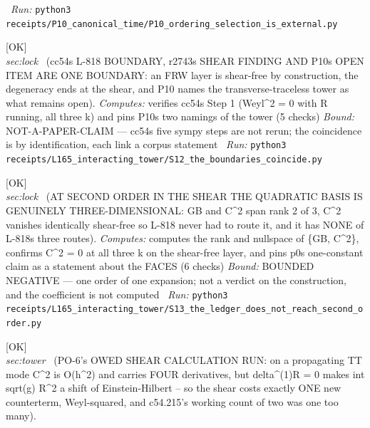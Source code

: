\begin{description}
\ \emph{Run:} \texttt{python3 receipts/P10\_canonical\_time/P10\_ordering\_selection\_is\_external.py}
\item[\label{rcpt:S12_the_boundaries_coincide}\textbf{}\quad\texttt{S12\_the\_boundaries\_coincide}]\hfill\textsf{[OK]}\\
\textit{sec:lock} \ (cc54s L-818 BOUNDARY, r2743s SHEAR FINDING AND P10s OPEN ITEM ARE ONE BOUNDARY: an FRW layer is shear-free by construction, the degeneracy ends at the shear, and P10 names the transverse-traceless tower as what remains open). 
\emph{Computes:} verifies cc54s Step 1 (Weyl\textasciicircum{}2 = 0 with R running, all three k) and pins P10s two namings of the tower (5 checks)
 \emph{Bound:} NOT-A-PAPER-CLAIM --- cc54s five sympy steps are not rerun; the coincidence is by identification, each link a corpus statement
\ \emph{Run:} \texttt{python3 receipts/L165\_interacting\_tower/S12\_the\_boundaries\_coincide.py}
\item[\label{rcpt:S13_the_ledger_does_not_reach_second_order}\textbf{}\quad\texttt{S13\_the\_ledger\_does\_not\_reach\_second\_order}]\hfill\textsf{[OK]}\\
\textit{sec:lock} \ (AT SECOND ORDER IN THE SHEAR THE QUADRATIC BASIS IS GENUINELY THREE-DIMENSIONAL: GB and C\textasciicircum{}2 span rank 2 of 3, C\textasciicircum{}2 vanishes identically shear-free so L-818 never had to route it, and it has NONE of L-818s three routes). 
\emph{Computes:} computes the rank and nullspace of \{GB, C\textasciicircum{}2\}, confirms C\textasciicircum{}2 = 0 at all three k on the shear-free layer, and pins p0s one-constant claim as a statement about the FACES (6 checks)
 \emph{Bound:} BOUNDED NEGATIVE --- one order of one expansion; not a verdict on the construction, and the coefficient is not computed
\ \emph{Run:} \texttt{python3 receipts/L165\_interacting\_tower/S13\_the\_ledger\_does\_not\_reach\_second\_order.py}
\item[\label{rcpt:S1_the_shear_needs_exactly_one_new_counterterm}\textbf{}\quad\texttt{S1\_the\_shear\_needs\_exactly\_one\_new\_counterterm}]\hfill\textsf{[OK]}\\
\textit{sec:tower} \ (PO-6's OWED SHEAR CALCULATION RUN: on a propagating TT mode C\textasciicircum{}2 is O(h\textasciicircum{}2) and carries FOUR derivatives, but delta\textasciicircum{}(1)R = 0 makes int sqrt(g) R\textasciicircum{}2 a shift of Einstein-Hilbert -- so the shear costs exactly ONE new counterterm, Weyl-squared, and c54.215's working count of two was one too many). 

\end{description}
